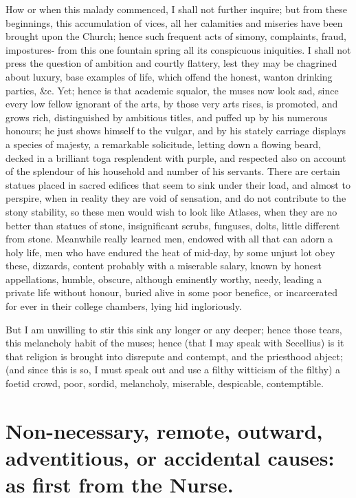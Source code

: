 {{{How or when this malady commenced, I shall not further inquire; but from these
beginnings, this accumulation of vices, all her calamities and miseries have
been brought upon the Church; hence such frequent acts of simony, complaints,
fraud, impostures- from this one fountain spring all its conspicuous
iniquities. I shall not press the question of ambition and courtly flattery,
lest they may be chagrined about luxury, base examples of life, which offend
the honest, wanton drinking parties, \&c. Yet; hence is that academic squalor,
the muses now look sad, since every low fellow ignorant of the arts, by those
very arts rises, is promoted, and grows rich, distinguished by ambitious
titles, and puffed up by his numerous honours; he just shows himself to the
vulgar, and by his stately carriage displays a species of majesty, a remarkable
solicitude, letting down a flowing beard, decked in a brilliant toga
resplendent with purple, and respected also on account of the splendour of his
household and number of his servants. There are certain statues placed in
sacred edifices that seem to sink under their load, and almost to perspire,
when in reality they are void of sensation, and do not contribute to the stony
stability, so these men would wish to look like Atlases, when they are no
better than statues of stone, insignificant scrubs, funguses, dolts, little
different from stone. Meanwhile really learned men, endowed with all that can
adorn a holy life, men who have endured the heat of mid-day, by some unjust lot
obey these, dizzards, content probably with a miserable salary, known by honest
appellations, humble, obscure, although eminently worthy, needy, leading a
private life without honour, buried alive in some poor benefice, or
incarcerated for ever in their college chambers, lying hid ingloriously.

But I am unwilling to stir this sink any longer or any deeper; hence those
tears, this melancholy habit of the muses; hence (that I may speak with
Secellius) is it that religion is brought into disrepute and contempt, and the
priesthood abject; (and since this is so, I must speak out and use a filthy
witticism of the filthy) a foetid crowd, poor, sordid, melancholy, miserable,
despicable, contemptible.
}

\section[Remote or accidental causes]{Non-necessary, remote, outward, adventitious, or accidental causes: as first from the Nurse.}

}}
